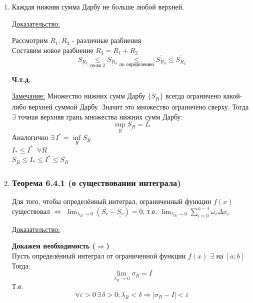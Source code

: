 \documentclass[12pt]{article}
\begin{document}
\begin{enumerate}
\begin{adjustwidth}{1.5em}{1.5em}
\begin{center}
            \end{center}
        \end{adjustwidth}
        \item Каждая нижняя сумма Дарбу не больше любой верхней.\par\noindent
        \underline{Доказательство:}
        \begin{adjustwidth}{1.5em}{1.5em}
            Рассмотрим $R_1,R_2$ - различные разбиения\\
            Составим новое разбиение $R_3=R_1+R_2$\\
            \[\underline{S_{R_1}} \underset{\text{св-во 2}}{\leq} \underline{S_{R_3}} \underset{\text{по определению}}{\leq} \overline{S_{R_3}} \leq \overline{S_{R_2}}\]
            \begin{center}
                \textbf{Ч.т.д.}
            \end{center}
        \end{adjustwidth}\noindent
        \underline{Замечание:} Множество нижних сумм Дарбу $\{\underline{S_R}\}$ всегда ограничено какой-либо верхней суммой Дарбу. Значит это множество ограничено сверху. Тогда $\exists$ точная верхняя грань множества нижних сумм Дарбу:
        \[ \underset{R}{\sup} \underline{S_R} = I_* \]
        Аналогично $\exists\,I^* = \underset{R}{\inf} \overline{S_R}$\\
        $I_* \leq I^* \;\; \forall R$\\
        $\underline{S_R} \leq I_* \leq I^* \leq \overline{S_R}$
        \item \subsubsection*{Теорема 6.4.1 (о существовании интеграла)}\label{th:6.4.1}
        Для того, чтобы определённый интеграл, ограниченный функции $f(x)$ существовал $\Longleftrightarrow$ $\lim_{\lambda_R \to 0} (\overline{S_r}- \underline{S_r})=0$,
        т.е. $\lim_{\lambda_R \to 0}\sum_{i=0}^{n-1} \omega_i \Delta x_i$ \par\noindent
        \underline{Доказательство:}
        \begin{adjustwidth}{1.5em}{1.5em}
            \textbf{Докажем необходимость ($\Rightarrow$)}\\
            Пусть определённый интеграл от ограниченной функции $f(x)$ $\exists$ на $[a;b]$\\
            Тогда:
            \[ \lim_{\lambda_R \to 0} \sigma_R = I\]
            Т.е. 
            \[ \forall \varepsilon > 0\,\exists\,\delta > 0: \lambda_R < \delta \Rightarrow |\sigma_R - I| < \varepsilon \]

\end{adjustwidth}
\end{enumerate}
\end{document}
